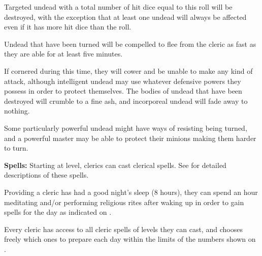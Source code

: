 \begin{multicols*}{2}
Targeted undead with a total number of hit dice equal to this roll will be destroyed, with the exception that at least one undead will always be affected even if it has more hit dice than the roll.

Undead that have been turned will be compelled to flee from the cleric as fast as they are able for at least five minutes.

If cornered during this time, they will cower and be unable to make any kind of attack, although intelligent undead may use whatever defensive powers they possess in order to protect themselves. The bodies of undead that have been destroyed will crumble to a fine ash, and incorporeal undead will fade away to nothing.

Some particularly powerful undead might have ways of resisting being turned, and a powerful master may be able to protect their minions making them harder to turn.


\textbf{Spells:} Starting at  level, clerics can cast clerical spells. See  for detailed descriptions of these spells.

Providing a cleric has had a good night’s sleep (8 hours), they can spend an hour meditating and/or performing religious rites after waking up in order to gain spells for the day as indicated on .

Every cleric has access to all cleric spells of levels they can cast, and chooses freely which ones to prepare each day within the limits of the numbers shown on .


\end{multicols*}
